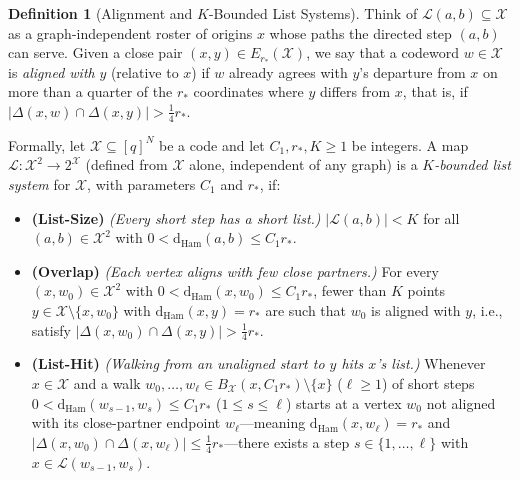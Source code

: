 \documentclass[11pt]{article}
\theoremstyle{definition}
\newtheorem*{definition*}{Definition}
\theoremstyle{remark}
\newcommand{\Ham}{\mathrm{Ham}}
\newcommand{\dHam}{\mathrm{d}_{\Ham}}
\begin{document}
\begin{definition*}[Alignment and $K$-Bounded List Systems]
Think of $\mathcal{L}(a, b) \subseteq \mathcal{X}$ as a graph-independent roster of origins $x$ whose paths the directed step $(a, b)$ can serve. Given a close pair $(x, y) \in E_{r_*}(\mathcal{X})$, we say that a codeword $w \in \mathcal{X}$ is \emph{aligned with} $y$ (relative to $x$) if $w$ already agrees with $y$'s departure from $x$ on more than a quarter of the $r_*$ coordinates where $y$ differs from $x$, that is, if $|\Delta(x, w) \cap \Delta(x, y)| > \frac{1}{4} r_*$.

Formally, let $\mathcal{X} \subseteq [q]^N$ be a code and let $C_1, r_*, K \ge 1$ be integers. A map $\mathcal{L} : \mathcal{X}^2 \to 2^{\mathcal{X}}$ (defined from $\mathcal{X}$ alone, independent of any graph) is a \emph{$K$-bounded list system} for $\mathcal{X}$, with parameters $C_1$ and $r_*$, if:
\begin{itemize}[leftmargin=2em,topsep=4pt,itemsep=3pt]
  \item \textbf{(List-Size)} \emph{(Every short step has a short list.)} $|\mathcal{L}(a, b)| < K$ for all $(a, b) \in \mathcal{X}^2$ with $0 < \dHam(a, b) \le C_1 r_*$.
  \item \textbf{(Overlap)} \emph{(Each vertex aligns with few close partners.)} For every $(x, w_0) \in \mathcal{X}^2$ with $0 < \dHam(x, w_0) \le C_1 r_*$, fewer than $K$ points $y \in \mathcal{X} \setminus \{x, w_0\}$ with $\dHam(x, y) = r_*$ are such that $w_0$ is aligned with $y$, i.e., satisfy $|\Delta(x, w_0) \cap \Delta(x, y)| > \frac{1}{4} r_*$.
  \item \textbf{(List-Hit)} \emph{(Walking from an unaligned start to $y$ hits $x$'s list.)} Whenever $x \in \mathcal{X}$ and a walk $w_0, \dots, w_\ell \in B_{\mathcal{X}}(x, C_1 r_*) \setminus \{x\}$ ($\ell \ge 1$) of short steps $0 < \dHam(w_{s-1}, w_s) \le C_1 r_*$ ($1 \le s \le \ell$) starts at a vertex $w_0$ not aligned with its close-partner endpoint $w_\ell$---meaning $\dHam(x, w_\ell) = r_*$ and $|\Delta(x, w_0) \cap \Delta(x, w_\ell)| \le \frac{1}{4} r_*$---there exists a step $s \in \{1, \dots, \ell\}$ with $x \in \mathcal{L}(w_{s-1}, w_s)$.
\end{itemize}
\end{definition*}
\end{document}
